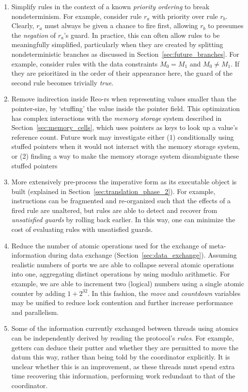 \begin{enumerate}
	\item Simplify rules in the context of a known \textit{priority ordering} to break nondeterminism. For example, consider rule $r_a$ with priority over rule $r_b$. Clearly, $r_a$ must always be given a chance to fire first, allowing $r_b$ to presumes the \textit{negation} of $r_a$'s guard. In practice, this can often allow rules to be meaningfully simplified, particularly when they are created by splitting nondeterministic branches as discussed in Section~\ref{sec:future_branches}. For example, consider rules with the data constraints $M_0=M_1$ and $M_0\neq{}M_1$. If they are prioritized in the order of their appearance here, the guard of the second rule becomes trivially \textit{true}.
	
	\item Remove indirection inside Reo-rs when representing values smaller than the pointer-size, by `stuffing' the value inside the pointer field. This optimization has complex interactions with the \textit{memory storage} system described in Section~\ref{sec:memory_cells}, which uses pointers as keys to look up a value's reference count. Future work may investigate either (1) conditionally using stuffed pointers when it would not interact with the memory storage system, or (2) finding a way to make the memory storage system disambiguate these stuffed pointers
	
	
	\item More extensively pre-process the imperative form as its executable object is built (explained in Section~\ref{sec:translation_phase_2}). For example, instructions can be fragmented and re-organized such that the effects of a fired rule are unaltered, but rules are able to detect and recover from \textit{unsatisfied guards} by rolling back earlier. In this way, one can minimize the cost of evaluating rules with unsatisfied guards.
	
	\item Reduce the number of atomic operations used for the exchange of meta-information during data exchange (Section~\ref{sec:data_exchange}). Assuming realistic numbers of ports we are able to collapse several atomic operations into one, aggregating distinct operations by using modulo arithmetic. For example, we are able to increment two (logical) numbers using a single atomic counter by adding $1 + 2^{32}$. In this fashion, the \textit{move} and \textit{countdown} variables may be unified to reduce lock contention and further increase performance and parallelism.
	
	\item Some of the information currently exchanged between threads using atomics can be independently derived by reading the protocol's \textit{rules}. For example, getters can deduce their putter and whether they are permitted to move the datum this way, rather than being told by the coordinator explicitly. It is unclear whether this is an improvement, as these threads must spend extra time recovering this information, performing work redundant to that of the coordinator. 
\end{enumerate}
